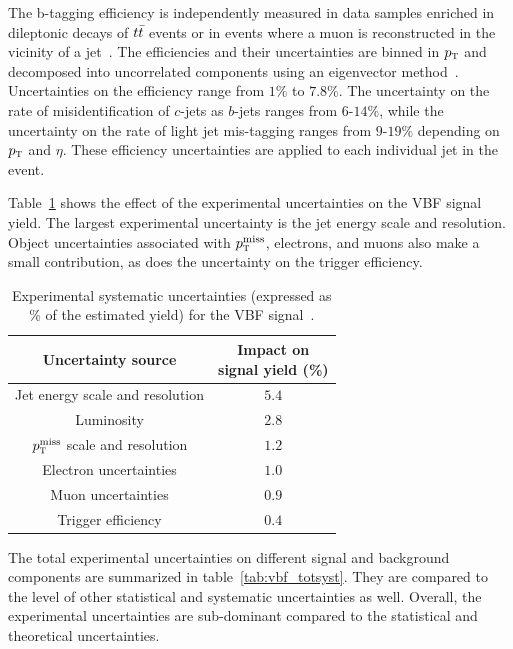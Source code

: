 The b-tagging efficiency is independently measured in data samples enriched in dileptonic decays of $t\bar{t}$ events or in events where a muon is reconstructed in the vicinity of a jet~\cite{btag-calib,btag-muons}. The efficiencies and their uncertainties are binned in $p_{\textrm{\footnotesize\sc t}}$ and decomposed into uncorrelated components using an eigenvector method~\cite{BtagCalib1}. Uncertainties on the efficiency range from $1\%$ to $7.8\%$. The uncertainty on the rate of misidentification of $c$-jets as $b$-jets ranges from $6$-$14$\%, while the uncertainty on the rate of light jet mis-tagging ranges from $9$-$19\%$ depending on $p_{\textrm{\footnotesize\sc t}}$ and $\eta$. These efficiency uncertainties are applied to each individual jet in the event. 

Table~\ref{tab:vbf_exptsys} shows the effect of the experimental uncertainties on the VBF signal yield. The largest experimental uncertainty is the jet energy scale and resolution. Object uncertainties associated with $p_{\textrm{\footnotesize\sc t}}^{\rm miss}$, electrons, and muons also make a small contribution, as does the uncertainty on the trigger efficiency.

\begin{table}[h!]
\centering
\captionsetup{justification=centering}
\begin{tabular}{|c|c|}
\hline
Uncertainty source & \specialcell{Impact on \\signal yield (\%)}  \\ \hline
Jet energy scale and resolution & $5.4$ \\ \hline
Luminosity & $2.8$ \\ \hline
$p_{\textrm{\footnotesize\sc t}}^{\rm miss}$ scale and resolution & $1.2$ \\ \hline
Electron uncertainties & $1.0$ \\ \hline
Muon uncertainties & $0.9$ \\ \hline
Trigger efficiency & $0.4$ \\ \hline
\end{tabular}
\caption{Experimental systematic uncertainties (expressed as \% of the estimated yield) for the VBF signal~\cite{WW2015}.}
\label{tab:vbf_exptsys}
\end{table}

The total experimental uncertainties on different signal and background components are summarized in table~\ref{tab:vbf_totsyst}. They are compared to the level of other statistical and systematic uncertainties as well. Overall, the experimental uncertainties are sub-dominant compared to the statistical and theoretical uncertainties.

